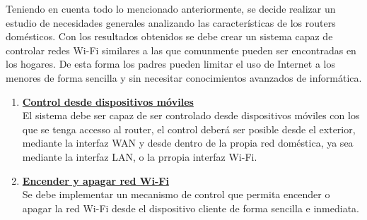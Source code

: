 \documentclass[12pt]{article}
\begin{document}
    Teniendo en cuenta todo lo mencionado anteriormente, se decide realizar un estudio de necesidades generales analizando las características de los routers domésticos. Con los resultados obtenidos se debe crear un sistema capaz de controlar redes Wi-Fi similares a las que comunmente pueden ser encontradas en los hogares. De esta forma  los padres pueden limitar el uso de Internet a los menores de forma sencilla y sin necesitar conocimientos avanzados de informática.
    \begin{enumerate}
        \item \textbf{\underline{Control desde dispositivos móviles}} \\
            El sistema debe ser capaz de ser controlado desde dispositivos móviles con los que se tenga accesso al router, el control deberá ser posible desde el exterior, mediante la interfaz WAN y desde dentro de la propia red doméstica, ya sea mediante la interfaz LAN, o la prropia interfaz Wi-Fi.
        
        \item \textbf{\underline{Encender y apagar red Wi-Fi}} \\
            Se debe implementar un mecanismo de control que permita encender o apagar la red Wi-Fi desde el dispositivo cliente de forma sencilla e inmediata.


\end{enumerate}
\end{document}
